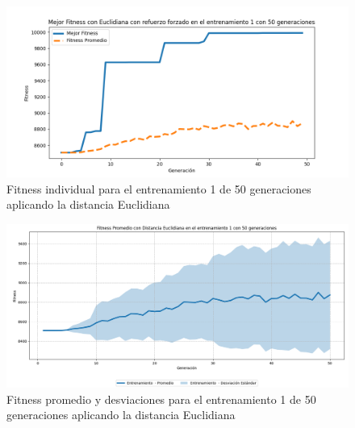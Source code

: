 \documentclass[conference]{IEEEtran}
\begin{document}
\begin{figure}[H]
    \centering
    \includegraphics[width=0.9 \linewidth]{Euclidiana/Fitnes_individual/Fitness_1_Eucli_50Gen.png}
    \caption{Fitness individual para el entrenamiento 1 de 50 generaciones aplicando la distancia Euclidiana}
    \label{fig:eucli_1_50}
\end{figure}
\begin{figure}[H]
    \centering
    \includegraphics[width=0.9 \linewidth]{Euclidiana/Fitnes_individual/Fitness_1_Eucli_50Gen_Sombra.png}
    \caption{Fitness promedio y desviaciones para el entrenamiento 1 de 50 generaciones aplicando la distancia Euclidiana}
    \label{fig:eucli_1_50_sombra}
\end{figure}
\end{document}
